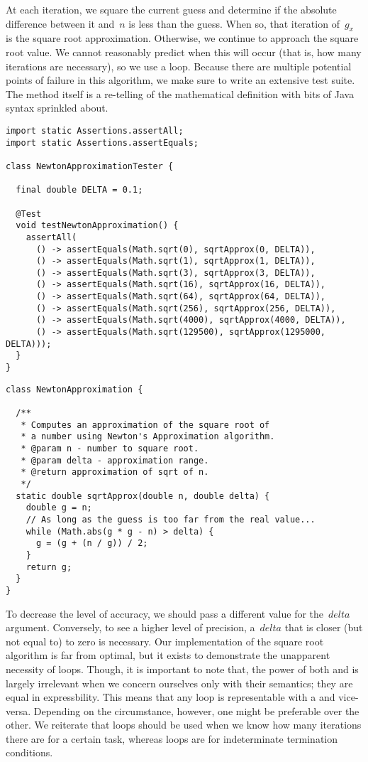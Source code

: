At each iteration, we square the current guess and determine if the absolute difference between it and~$n$ is less than the guess. 
When so, that iteration of~$g_x$ is the square root approximation. 
Otherwise, we continue to approach the square root value. 
We cannot reasonably predict when this will occur (that is, how many iterations are necessary), so we use a  loop. 
Because there are multiple potential points of failure in this algorithm, we make sure to write an extensive test suite. 
The method itself is a re-telling of the mathematical definition with bits of Java syntax sprinkled about. 

\begin{lstlisting}[language=MyJava]
import static Assertions.assertAll;
import static Assertions.assertEquals;

class NewtonApproximationTester {

  final double DELTA = 0.1;

  @Test
  void testNewtonApproximation() {
    assertAll(
      () -> assertEquals(Math.sqrt(0), sqrtApprox(0, DELTA)),
      () -> assertEquals(Math.sqrt(1), sqrtApprox(1, DELTA)),
      () -> assertEquals(Math.sqrt(3), sqrtApprox(3, DELTA)),
      () -> assertEquals(Math.sqrt(16), sqrtApprox(16, DELTA)),
      () -> assertEquals(Math.sqrt(64), sqrtApprox(64, DELTA)),
      () -> assertEquals(Math.sqrt(256), sqrtApprox(256, DELTA)),
      () -> assertEquals(Math.sqrt(4000), sqrtApprox(4000, DELTA)),
      () -> assertEquals(Math.sqrt(129500), sqrtApprox(1295000, DELTA)));
  }
}
\end{lstlisting}


\begin{lstlisting}[language=MyJava]
class NewtonApproximation {

  /**
   * Computes an approximation of the square root of
   * a number using Newton's Approximation algorithm.
   * @param n - number to square root.
   * @param delta - approximation range.
   * @return approximation of sqrt of n.
   */
  static double sqrtApprox(double n, double delta) {
    double g = n;
    // As long as the guess is too far from the real value...
    while (Math.abs(g * g - n) > delta) {
      g = (g + (n / g)) / 2;
    }
    return g;
  }
}
\end{lstlisting}

To decrease the level of accuracy, we should pass a different value for the~$\mathit{delta}$ argument. 
Conversely, to see a higher level of precision, a~$\mathit{delta}$ that is closer (but not equal to) to zero is necessary. 
Our implementation of the square root algorithm is far from optimal, but it exists to demonstrate the unapparent necessity of  loops. 
Though, it is important to note that, the power of both  and  is largely irrelevant when we concern ourselves only with their semantics; they are equal in expressbility.
This means that any  loop is representable with a  and vice-versa. 
Depending on the circumstance, however, one might be preferable over the other. 
We reiterate that  loops should be used when we know how many iterations there are for a certain task, whereas  loops are for indeterminate termination conditions. 

